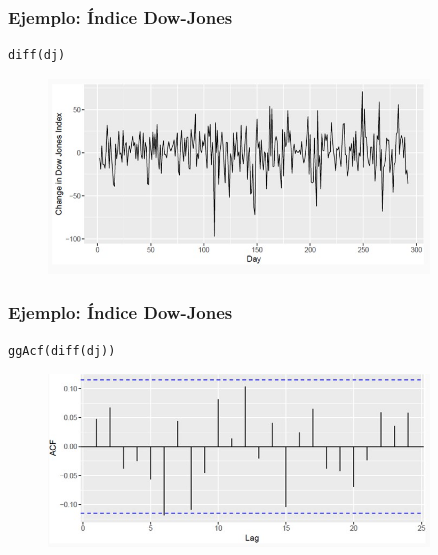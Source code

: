\documentclass[10pt]{beamer}
\begin{document}







\begin{frame}[fragile]
\frametitle{Ejemplo: Índice Dow-Jones}


\lstset{language=r,label= ,caption= ,captionpos=b,numbers=none}
\begin{lstlisting}
diff(dj)
\end{lstlisting}

\pause

\begin{figure}
\begin{center}
    \includegraphics[width=0.9\textwidth]{Imagen4.JPG}
\end{center}
\end{figure}


\end{frame}






\begin{frame}[fragile]
\frametitle{Ejemplo: Índice Dow-Jones}


\lstset{language=r,label= ,caption= ,captionpos=b,numbers=none}
\begin{lstlisting}
ggAcf(diff(dj))
\end{lstlisting}

\pause

\begin{figure}
\begin{center}
    \includegraphics[width=0.9\textwidth]{Imagen5.JPG}
\end{center}
\end{figure}


\end{frame}
\end{document}
